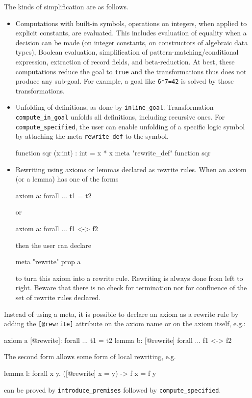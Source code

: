 The kinds of simplification are as follows.
\begin{itemize}
\item Computations with built-in symbols, \eg operations on integers,
  when applied to explicit constants, are evaluated. This includes
  evaluation of equality when a decision can be made (on integer
  constants, on constructors of algebraic data types), Boolean
  evaluation, simplification of pattern-matching/conditional expression,
  extraction of record fields, and beta-reduction.
  At best, these computations reduce the goal to
  \verb|true| and the transformations thus does not produce any sub-goal.
  For example, a goal
  like \verb|6*7=42| is solved by those transformations.
\item Unfolding of definitions, as done by \verb|inline_goal|. Transformation
  \verb|compute_in_goal| unfolds all definitions, including recursive ones.
  For \verb|compute_specified|, the user can enable unfolding of a specific
  logic symbol by attaching the meta \verb|rewrite_def| to the symbol.
\begin{whycode}
function sqr (x:int) : int = x * x
meta "rewrite_def" function sqr
\end{whycode}
\item Rewriting using axioms or lemmas declared as rewrite rules. When
  an axiom (or a lemma) has one of the forms
\begin{whycode}
axiom a: forall ... t1 = t2
\end{whycode}
  or
\begin{whycode}
axiom a: forall ... f1 <-> f2
\end{whycode}
  then the user can declare
\begin{whycode}
meta "rewrite" prop a
\end{whycode}
  to turn this axiom into a rewrite rule. Rewriting is always done
  from left to right. Beware that there is no check for termination
  nor for confluence of the set of rewrite rules declared.
\end{itemize}
Instead of using a meta, it is possible to declare an axiom as a
rewrite rule by adding the \verb|[@rewrite]| attribute on the axiom name or
on the axiom itself, e.g.:
\begin{whycode}
axiom a [@rewrite]: forall ... t1 = t2
lemma b: [@rewrite] forall ... f1 <-> f2
\end{whycode}
The second form allows some form of local rewriting, e.g.
\begin{whycode}
lemma l: forall x y. ([@rewrite] x = y) -> f x = f y
\end{whycode}
can be proved by \verb|introduce_premises| followed by \verb|compute_specified|.

